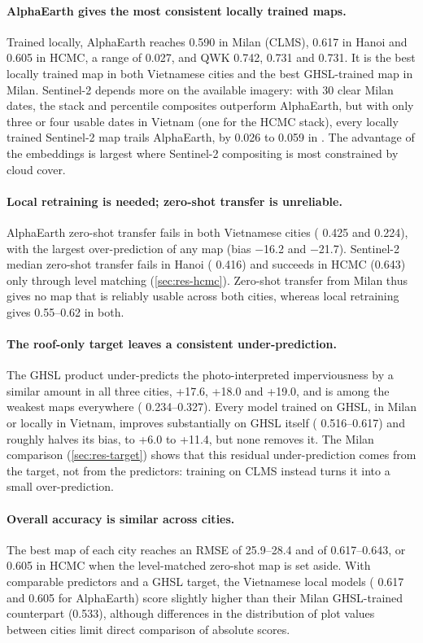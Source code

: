 \paragraph{AlphaEarth gives the most consistent locally trained maps.}
Trained locally, AlphaEarth reaches \Rsq{} 0.590 in Milan (CLMS), 0.617 in
Hanoi and 0.605 in HCMC, a range of 0.027, and QWK 0.742, 0.731 and 0.731. It
is the best locally trained map in both Vietnamese cities and the best
GHSL-trained map in Milan. Sentinel-2 depends more on the available
imagery: with 30 clear Milan dates, the stack and percentile composites
outperform AlphaEarth, but with only three or four usable dates in Vietnam
(one for the HCMC stack), every locally trained Sentinel-2 map trails
AlphaEarth, by 0.026
to 0.059 in \Rsq. The advantage of the embeddings is largest where
Sentinel-2 compositing is most constrained by cloud cover.

\paragraph{Local retraining is needed; zero-shot transfer is unreliable.}
AlphaEarth zero-shot transfer fails in both Vietnamese cities (\Rsq{} 0.425
and 0.224), with the largest over-prediction of any map (bias $-$16.2 and
$-$21.7\pp). Sentinel-2 median zero-shot transfer fails in Hanoi (\Rsq{}
0.416) and succeeds in HCMC (0.643) only through level matching
(\cref{sec:res-hcmc}). Zero-shot transfer from Milan thus gives no map that
is reliably usable across both cities, whereas local retraining gives
\Rsq{} 0.55--0.62 in both.

\paragraph{The roof-only target leaves a consistent under-prediction.} The
GHSL product under-predicts the photo-interpreted imperviousness by a
similar amount in all three cities, +17.6, +18.0 and +19.0\pp, and is among
the weakest maps everywhere (\Rsq{} 0.234--0.327). Every model trained on
GHSL, in Milan or locally in Vietnam, improves substantially on GHSL itself
(\Rsq{} 0.516--0.617) and roughly halves its bias, to +6.0 to +11.4\pp, but
none removes it. The Milan comparison (\cref{sec:res-target}) shows that
this residual under-prediction comes from the target, not from the
predictors: training on CLMS instead turns it into a small over-prediction.

\paragraph{Overall accuracy is similar across cities.} The best map of each
city reaches an RMSE of 25.9--28.4\pp{} and \Rsq{} of 0.617--0.643, or
0.605 in HCMC when the level-matched zero-shot map is set aside. With
comparable predictors and a GHSL target, the Vietnamese local models (\Rsq{}
0.617 and 0.605 for AlphaEarth) score slightly higher than their Milan
GHSL-trained counterpart (0.533), although differences in the distribution
of plot values between cities limit direct comparison of absolute scores.
